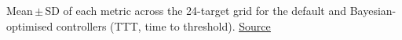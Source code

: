 Mean\,$\pm$\,SD of each metric across the 24-target grid for the default and Bayesian-optimised controllers (TTT, time to threshold). \href{https://github.com/tahmidazam/gg4/blob/main/notebooks/cartesian_control_sweep/cartesian_control_sweep.ipynb}{\underline{Source}}%